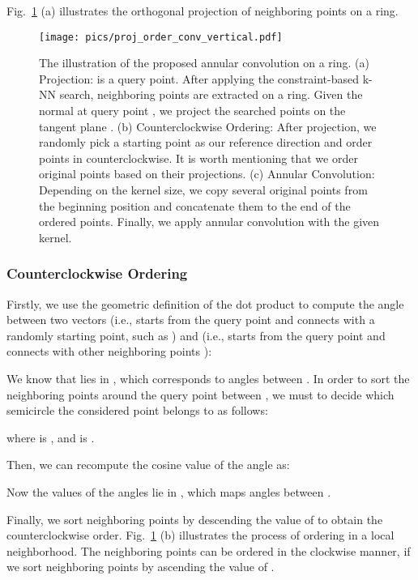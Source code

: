 \documentclass[10pt,twocolumn,letterpaper]{article}
\begin{document}
Fig.~\ref{fig:proj_order_conv_horiz} (a) illustrates the orthogonal projection of neighboring points on a ring.
\begin{figure}[t]
\begin{center}
  \texttt{[image: pics/proj\_order\_conv\_vertical.pdf]}\vspace{-5mm}
\end{center}
\caption{The illustration of the proposed annular convolution on a ring. (a) Projection:  is a query point. After applying the constraint-based k-NN search, neighboring points  are extracted on a ring. Given the normal  at query point , we project the searched points on the tangent plane . (b) Counterclockwise Ordering: After projection, we randomly pick a starting point as our reference direction  and order points in counterclockwise. It is worth mentioning that we order original points  based on their projections. (c) Annular Convolution: Depending on the kernel size, we copy several original points from the beginning position and concatenate them to the end of the ordered points. Finally, we apply annular convolution with the given kernel.}\vspace{-5mm}
\centering
\label{fig:proj_order_conv_horiz}
\end{figure}
\vspace{-3mm}
\subsubsection{Counterclockwise Ordering}\vspace{-1mm}
Firstly, we use the geometric definition of the dot product to compute the angle between two vectors  (i.e., starts from the query point  and connects with a randomly starting point, such as ) and  (i.e., starts from the query point  and connects with other neighboring points ):


We know that  lies in , which corresponds to angles between . In order to sort the neighboring points around the query point between , we must to decide which semicircle the considered point  belongs to as follows:

where  is , and  is .

Then, we can recompute the cosine value of the angle as:

Now the values of the angles lie in , which maps angles between .

Finally, we sort neighboring points  by descending the value of  to obtain the counterclockwise order. Fig.~\ref{fig:proj_order_conv_horiz} (b) illustrates the process of ordering in a local neighborhood. The neighboring points can be ordered in the clockwise manner, if we sort neighboring points  by ascending the value of .
\end{document}
